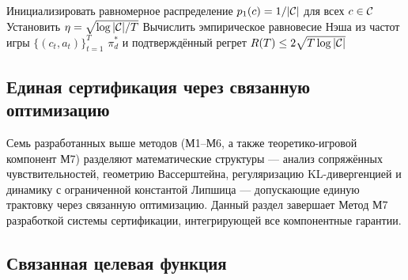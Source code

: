 \begin{algorithm}[htbp]
\caption{Теоретико-игровая робастность с онлайн-обучением, учитывающим неопределённость}\label{alg:game}
Инициализировать равномерное распределение $p_1(c) = 1/|\mathcal{C}|$ для всех $c\in\mathcal{C}$\;
Установить $\eta = \sqrt{\log|\mathcal{C}|/T}$\;
Вычислить эмпирическое равновесие Нэша из частот игры $\{(c_t,a_t)\}_{t=1}^T$\;
\Return $\pi_d^*$ и подтверждённый регрет $R(T)\le 2\sqrt{T\log|\mathcal{C}|}$
\end{algorithm}


\subsection{Единая сертификация через связанную оптимизацию}
\label{sec:unified}

Семь разработанных выше методов (М1--М6, а также теоретико-игровой компонент М7) разделяют математические структуры --- анализ сопряжённых чувствительностей, геометрию Вассерштейна, регуляризацию KL-дивергенцией и динамику с ограниченной константой Липшица --- допускающие единую трактовку через связанную оптимизацию. Данный раздел завершает Метод М7 разработкой системы сертификации, интегрирующей все компонентные гарантии.

\subsection{Связанная целевая функция}

